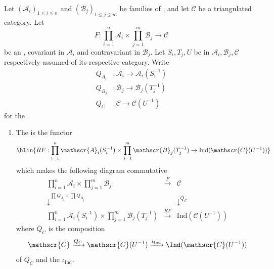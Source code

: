 \begin{definition} \label{definition:right_left_derived_functor_of_a_exact_mixed_variant_multifunctor_between_triangulated_categories_relative_to_saturated_multiplicative_systems}
Let $(\mathscr{A}_i)_{1 \le i \le n}$ and $(\mathscr{B}_j)_{1 \le j \le m}$ be families of , and let $\mathscr{C}$ be a triangulated category. Let 
$$F: \prod_{i=1}^n \mathscr{A}_i \times \prod_{j=1}^m \mathscr{B}_j \to \mathscr{C}$$ 
be an , covariant in $\mathscr{A}_i$ and contravariant in $\mathscr{B}_j$. Let $S_i, T_j, U$ be  in $\mathscr{A}_i, \mathscr{B}_j, \mathscr{C}$ respectively assumed  of its respective category. Write 
\begin{align*}
Q_{A_i}&: \mathscr{A}_i \to \mathscr{A}_i(S_i^{-1}) \\ 
Q_{B_j}&: \mathscr{B}_j \to \mathscr{B}_j(T_j^{-1}) \\
Q_{C}&: \mathscr{C} \to \mathscr{C}(U^{-1})
\end{align*}
for the . 


\begin{enumerate}
    \item The  is the functor 
    $$\hlin{RF: \prod_{i=1}^n \mathscr{A}_i(S_i^{-1}) \times \prod_{j=1}^m \mathscr{B}_j(T_j^{-1}) \to \text{Ind}(\mathscr{C}(U^{-1}))}$$
    which makes the following diagram commutative
    $$
    \begin{array}{ccc}
    \prod_{i=1}^n \mathscr{A}_i \times \prod_{j=1}^m \mathscr{B}_j & \xrightarrow{F} & \mathscr{C} \\
    \downarrow^{\prod Q_{A_i} \times \prod Q_{B_j}} & & \downarrow^{\overline{Q}_C} \\
    \prod_{i=1}^n \mathscr{A}_i(S_i^{-1}) \times \prod_{j=1}^m \mathscr{B}_j(T_j^{-1}) & \xrightarrow{RF} & \text{Ind}(\mathscr{C}(U^{-1}))
    \end{array}
    $$
    where $\overline{Q}_C$ is the composition 
    $$\mathscr{C} \xrightarrow{Q_C} \mathscr{C}(U^{-1}) \xrightarrow{\iota_{\text{Ind}}} \Ind(\mathscr{C}(U^{-1}))$$
    of $Q_C$ and the  $\iota_{\text{Ind}}$.



\end{enumerate}
\end{definition}
